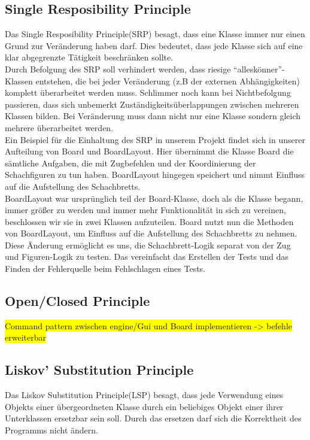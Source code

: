 \documentclass[
10pt, %
a4paper, %
oneside, %
headinclude,footinclude, %
BCOR5mm, %
]{scrartcl}
\begin{document}
\subsection{Single Resposibility Principle}
Das Single Resposibility Principle(SRP) besagt, dass eine Klasse immer nur einen Grund zur Veränderung haben darf. Dies bedeutet, dass jede Klasse sich auf eine klar abgegrenzte Tätigkeit beschränken sollte. 
\\
Durch Befolgung des SRP soll verhindert werden, dass riesige \enquote{alleskönner}-Klassen entstehen, die bei jeder Veränderung (z.B der externen Abhängigkeiten) komplett überarbeitet werden muss. Schlimmer noch kann bei Nichtbefolgung passieren, dass sich unbemerkt Zuständigkeitsüberlappungen zwischen mehreren Klassen bilden. Bei Veränderung muss dann nicht nur eine Klasse sondern gleich mehrere überarbeitet werden.
\\
Ein Beispiel für die Einhaltung des SRP in unserem Projekt findet sich in unserer Aufteilung von Board und BoardLayout. Hier übernimmt die Klasse Board die sämtliche Aufgaben, die mit Zugbefehlen und der Koordinierung der Schachfiguren zu tun haben. BoardLayout hingegen speichert und nimmt Einfluss auf die Aufstellung des Schachbretts.
\\
BoardLayout war ursprünglich teil der Board-Klasse, doch als die Klasse begann, immer größer zu werden und immer mehr Funktionalität in sich zu vereinen, beschlossen wir sie in zwei Klassen aufzuteilen.
Board nutzt nun die Methoden von BoardLayout, um Einfluss auf die Aufstellung des Schachbretts zu nehmen.
\\
Diese Änderung ermöglicht es uns, die Schachbrett-Logik separat von der Zug und Figuren-Logik zu testen. Das vereinfacht das Erstellen der Tests und das Finden der Fehlerquelle beim Fehlschlagen eines Tests.
\subsection{Open/Closed Principle}
\colorbox{yellow}{Command pattern zwischen engine/Gui und Board implementieren -> befehle erweiterbar}
\subsection{Liskov' Substitution Principle}
Das Liskov Substitution Principle(LSP) besagt, dass jede Verwendung eines Objekts einer übergeordneten Klasse durch ein beliebiges Objekt einer ihrer Unterklassen ersetzbar sein soll. Durch das ersetzen darf sich die Korrektheit des Programms nicht ändern.
\end{document}

